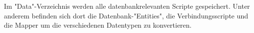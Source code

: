 
Im "Data"-Verzeichnis werden alle datenbankrelevanten Scripte gespeichert. Unter anderem befinden sich dort die Datenbank-"Entities", die Verbindungsscripte und die Mapper um die verschiedenen Datentypen zu konvertieren.

